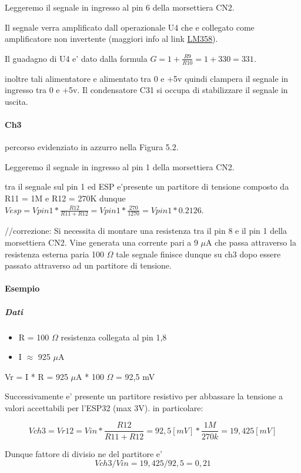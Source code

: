 \documentclass[12pt,a4paper]{report}
\begin{document}
Leggeremo il segnale in ingresso al pin 6 della morsettiera CN2.

Il segnale verra amplificato dall operazionale U4 che e collegato come amplificatore non invertente (maggiori info al link \href{https://elettronicasemplice.weebly.com/amplificatore-operazionale-non-invertente.html}{LM358}).

Il guadagno di U4 e' dato dalla formula $G = 1 + \frac{R9}{R10}= 1+330 = 331 $.

inoltre tali alimentatore e alimentato tra 0 e +5v quindi clampera il segnale in ingresso tra 0 e +5v.
Il condensatore C31 si occupa di stabilizzare il segnale in uscita.

\paragraph{Ch3}
percorso evidenziato in azzurro nella Figura 5.2.

Leggeremo il segnale in ingresso al pin 1 della morsettiera CN2.

tra il segnale sul pin 1 ed ESP e'presente un partitore di tensione composto da R11 = 1M e R12 = 270K dunque $Vesp = Vpin1 * \frac{R12}{R11+R12} = Vpin1 * \frac{270}{1270} = Vpin1 * 0.2126$.

//correzione:
Si necessita di montare una resistenza tra il pin 8 e il pin 1 della morsettiera CN2.
Vine generata una corrente pari a 9 $\mu$A che passa attraverso la resistenza esterna paria 100 $\Omega$
tale segnale finisce dunque su ch3 dopo essere passato attraverso ad un partitore di tensione.

\paragraph{Esempio}
\subparagraph{Dati}
\begin{itemize}
    \item R = 100 $\Omega$ resistenza collegata al pin 1,8
    \item I $\approx$ 925 $\mu$A 
\end{itemize}

Vr = I * R = 925 $\mu$A * 100 $\Omega$ = 92,5 mV

Successivamente e' presente un partitore resistivo per abbassare la tensione a valori accettabili per l'ESP32 (max 3V).
in particolare: 

\[ Vch3 = Vr12 = Vin * \frac{R12}{R11+R12} = 92,5 [mV] * \frac{1M}{270k} = 19,425 [mV] \]

Dunque fattore di divisio ne del partitore e' 
\[Vch3/Vin = 19,425/92,5 = 0,21 \]
\end{document}
